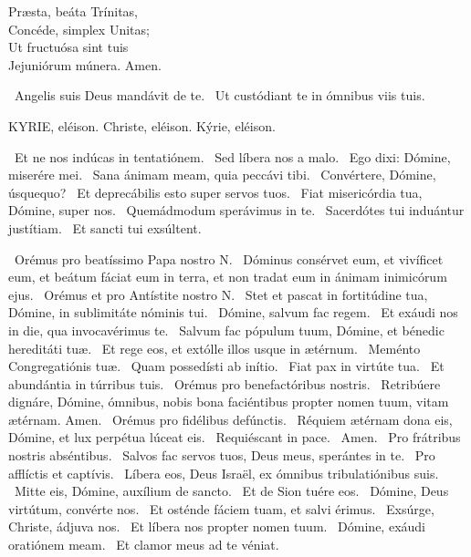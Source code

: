 Præsta, beáta Trínitas,\\
Concéde, simplex Unitas;\\
Ut fructuósa sint tuis\\
Jejuniórum múnera. Amen.

\V\ Angelis suis Deus mandávit de te. \R\ Ut custódiant te in ómnibus viis tuis.




KYRIE, eléison. Christe, eléison. Kýrie, eléison.

 \V\ Et ne nos indúcas in tentatiónem. \R\ Sed líbera nos a malo. \V\ Ego dixi: Dómine, miserére mei. \R\ Sana ánimam meam, quia peccávi tibi. \V\ Convértere, Dómine, úsquequo? \R\ Et deprecábilis esto super servos tuos. \V\ Fiat misericórdia tua, Dómine, super nos. \R\ Quemádmodum sperávimus in te. \V\ Sacerdótes tui induántur justítiam. \R\ Et sancti tui exsúltent.

\V\ Orémus pro beatíssimo Papa nostro N. \R\ Dóminus consérvet eum, et vivíficet eum, et beátum fáciat eum in terra, et non tradat eum in ánimam inimicórum ejus. \V\ Orémus et pro Antístite nostro N. \R\ Stet et pascat in fortitúdine tua, Dómine, in sublimitáte nóminis tui. \V\ Dómine, salvum fac regem. \R\ Et exáudi nos in die, qua invocavérimus te. \V\ Salvum fac pópulum tuum, Dómine, et bénedic hereditáti tuæ. \R\ Et rege eos, et extólle illos usque in ætérnum. \V\ Meménto Congregatiónis tuæ. \R\ Quam possedísti ab inítio. \V\ Fiat pax in virtúte tua. \R\ Et abundántia in túrribus tuis. \V\ Orémus pro benefactóribus nostris. \R\ Retribúere dignáre, Dómine, ómnibus, nobis bona faciéntibus propter nomen tuum, vitam ætérnam. Amen. \V\ Orémus pro fidélibus defúnctis. \R\ Réquiem ætérnam dona eis, Dómine, et lux perpétua lúceat eis. \V\ Requiéscant in pace. \R\ Amen. \V\ Pro frátribus nostris abséntibus. \R\ Salvos fac servos tuos, Deus meus, sperántes in te. \V\ Pro afflíctis et captívis. \R\ Líbera eos, Deus Israël, ex ómnibus tribulatiónibus suis. \V\ Mitte eis, Dómine, auxílium de sancto. \R\ Et de Sion tuére eos. \V\ Dómine, Deus virtútum, convérte nos. \R\ Et osténde fáciem tuam, et salvi érimus. \V\ Exsúrge, Christe, ádjuva nos. \R\ Et líbera nos propter nomen tuum. \V\ Dómine, exáudi oratiónem meam. \R\ Et clamor meus ad te véniat.

